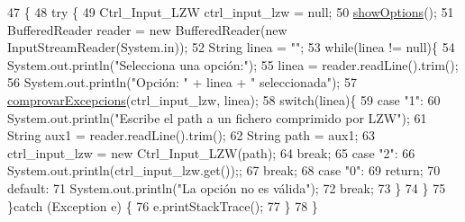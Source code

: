 \begin{DoxyCode}
47                                            \{
48     \textcolor{keywordflow}{try} \{
49         Ctrl\_Input\_LZW ctrl\_input\_lzw = null;
50         \hyperlink{classpersistencia_1_1input_1_1Driver____Ctrl__Input__LZW_a6b5f6f40be349f75d3ac91ecfb453088}{showOptions}();
51         BufferedReader reader = \textcolor{keyword}{new} BufferedReader(\textcolor{keyword}{new} InputStreamReader(System.in));
52         String linea = \textcolor{stringliteral}{""};
53         \textcolor{keywordflow}{while}(linea != null)\{
54             System.out.println(\textcolor{stringliteral}{"Selecciona una opción:"});
55             linea = reader.readLine().trim();
56             System.out.println(\textcolor{stringliteral}{"Opción: "} + linea + \textcolor{stringliteral}{" seleccionada"});
57             \hyperlink{classpersistencia_1_1input_1_1Driver____Ctrl__Input__LZW_a86e186fca84cfae1f5a019b4853a0902}{comprovarExcepcions}(ctrl\_input\_lzw, linea);
58             \textcolor{keywordflow}{switch}(linea)\{
59                 \textcolor{keywordflow}{case} \textcolor{stringliteral}{"1"}:
60                     System.out.println(\textcolor{stringliteral}{"Escribe el path a un fichero comprimido por LZW"});
61                     String aux1 = reader.readLine().trim();
62                     String path = aux1;
63                     ctrl\_input\_lzw = \textcolor{keyword}{new} Ctrl\_Input\_LZW(path);
64                 \textcolor{keywordflow}{break};
65                 \textcolor{keywordflow}{case} \textcolor{stringliteral}{"2"}:
66                     System.out.println(ctrl\_input\_lzw.get());;
67                 \textcolor{keywordflow}{break};
68                 \textcolor{keywordflow}{case} \textcolor{stringliteral}{"0"}:
69                     \textcolor{keywordflow}{return};
70                 \textcolor{keywordflow}{default}:
71                     System.out.println(\textcolor{stringliteral}{"La opción no es válida"});
72                 \textcolor{keywordflow}{break};
73             \}
74         \}
75     \}\textcolor{keywordflow}{catch} (Exception e) \{
76         e.printStackTrace();
77     \}
78     \}
\end{DoxyCode}
\mbox{\label{classpersistencia_1_1input_1_1Driver____Ctrl__Input__LZW_a6b5f6f40be349f75d3ac91ecfb453088}} 

